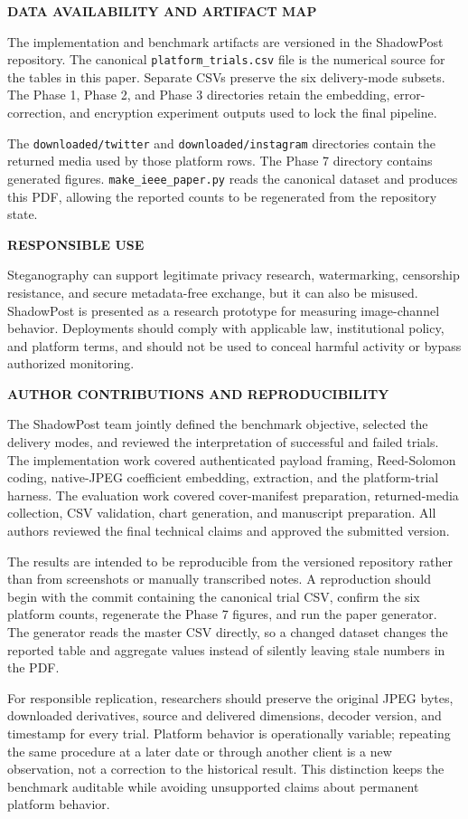 \documentclass[conference]{IEEEtran}
\newcommand{\paperheading}[1]{\Needspace{4\baselineskip}\vspace{1.1ex}\par\noindent\textbf{\MakeUppercase{#1}}\par\vspace{0.5ex}}
\begin{document}
\paperheading{Data Availability and Artifact Map}
The implementation and benchmark artifacts are versioned in the ShadowPost repository. The canonical \texttt{platform\_trials.csv} file is the numerical source for the tables in this paper. Separate CSVs preserve the six delivery-mode subsets. The Phase 1, Phase 2, and Phase 3 directories retain the embedding, error-correction, and encryption experiment outputs used to lock the final pipeline.

The \texttt{downloaded/twitter} and \texttt{downloaded/instagram} directories contain the returned media used by those platform rows. The Phase 7 directory contains generated figures. \texttt{make\_ieee\_paper.py} reads the canonical dataset and produces this PDF, allowing the reported counts to be regenerated from the repository state.

\paperheading{Responsible Use}
Steganography can support legitimate privacy research, watermarking, censorship resistance, and secure metadata-free exchange, but it can also be misused. ShadowPost is presented as a research prototype for measuring image-channel behavior. Deployments should comply with applicable law, institutional policy, and platform terms, and should not be used to conceal harmful activity or bypass authorized monitoring.

\paperheading{Author Contributions and Reproducibility}
The ShadowPost team jointly defined the benchmark objective, selected the delivery modes, and reviewed the interpretation of successful and failed trials. The implementation work covered authenticated payload framing, Reed-Solomon coding, native-JPEG coefficient embedding, extraction, and the platform-trial harness. The evaluation work covered cover-manifest preparation, returned-media collection, CSV validation, chart generation, and manuscript preparation. All authors reviewed the final technical claims and approved the submitted version.

The results are intended to be reproducible from the versioned repository rather than from screenshots or manually transcribed notes. A reproduction should begin with the commit containing the canonical trial CSV, confirm the six platform counts, regenerate the Phase 7 figures, and run the paper generator. The generator reads the master CSV directly, so a changed dataset changes the reported table and aggregate values instead of silently leaving stale numbers in the PDF.

For responsible replication, researchers should preserve the original JPEG bytes, downloaded derivatives, source and delivered dimensions, decoder version, and timestamp for every trial. Platform behavior is operationally variable; repeating the same procedure at a later date or through another client is a new observation, not a correction to the historical result. This distinction keeps the benchmark auditable while avoiding unsupported claims about permanent platform behavior.
\end{document}
